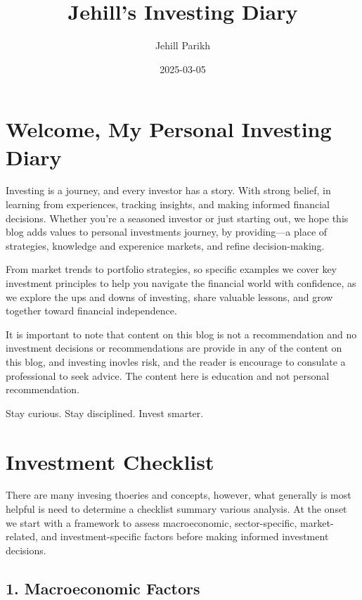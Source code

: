 \documentclass[
]{book}
\title{Jehill's Investing Diary}
\author{Jehill Parikh}
\date{2025-03-05}
\begin{document}
\maketitle

{
\setcounter{tocdepth}{1}
\tableofcontents
}
\chapter{Welcome, My Personal Investing Diary}\label{welcome-my-personal-investing-diary}

Investing is a journey, and every investor has a story. With strong belief, in learning from experiences, tracking insights, and making informed financial decisions. Whether you're a seasoned investor or just starting out, we hope this blog adds values to personal investments journey, by providing---a place of strategies, knowledge and experenice markets, and refine decision-making.

From market trends to portfolio strategies, so specific examples we cover key investment principles to help you navigate the financial world with confidence, as we explore the ups and downs of investing, share valuable lessons, and grow together toward financial independence.

It is important to note that content on this blog is not a recommendation and no investment decisions or recommendations are provide in any of the content on this blog, and investing inovles risk, and the reader is encourage to consulate a professional to seek advice. The content here is education and not personal recommendation.

Stay curious. Stay disciplined. Invest smarter.

\chapter{Investment Checklist}\label{investment-checklist}

There are many invesing thoeries and concepts, however, what generally is most helpful is need to determine a checklist summary various analysis. At the onset we start with a framework to assess macroeconomic, sector-specific, market-related, and investment-specific factors before making informed investment decisions.

\section{1. Macroeconomic Factors}\label{macroeconomic-factors}
\end{document}
